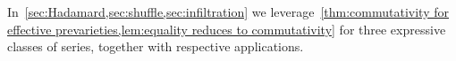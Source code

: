 In~\cref{sec:Hadamard,sec:shuffle,sec:infiltration}
we leverage~\cref{thm:commutativity for effective prevarieties,lem:equality reduces to commutativity}
for three expressive classes of series, together with respective applications.
%
